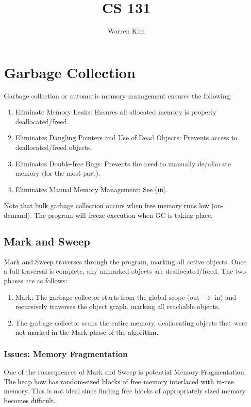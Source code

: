 \documentclass{article}
\title{CS 131}
\author{Warren Kim}
\begin{document}
\maketitle

\tableofcontents

\newpage
\section{Garbage Collection}
Garbage collection or automatic memory management ensures the
following:
\begin{enumerate}[label=(\roman*)]
\item Eliminate Memory Leaks: Ensures all allocated memory is properly
  deallocated/freed.
\item Eliminates Dangling Pointers and Use of Dead Objects: Prevents
  access to deallocated/freed objects.
\item Eliminates Double-free Bugs: Prevents the need to manually
  de/allocate memory (for the most part).
\item Eliminates Manual Memory Management: See (iii).
\end{enumerate}
Note that bulk garbage collection occurs when free memory runs low
(on-demand). The program will freeze execution when GC is taking place.


\subsection{Mark and Sweep}
Mark and Sweep traverses through the program, marking all active
objects. Once a full traversal is complete, any unmarked objects are
deallocated/freed. The two phases are as follows:
\begin{enumerate}[label=(\roman*)]
\item Mark: The garbage collector starts from the global scope (out $\to$ in) and
recursively traverses the object graph, marking all reachable
objects.
\item The garbage collector scans the entire memory, deallocating objects
that were not marked in the Mark phase of the algorithm.
\end{enumerate}



\subsubsection{Issues: Memory Fragmentation}
One of the consequences of Mark and Sweep is potential Memory
Fragmentation. The heap how has random-sized blocks of free memory
interlaced with in-use memory. This is not ideal since finding free
blocks of appropriately sized memory becomes difficult. 
\end{document}
